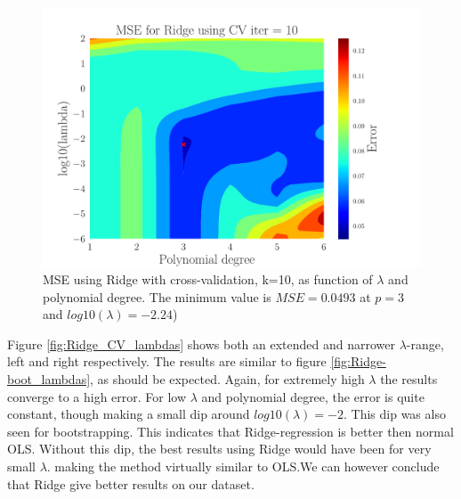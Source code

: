 \documentclass[reprint,english,notitlepage,aps,nobalancelastpage,nofootinbib]{revtex4-1}  %
\begin{document}
\begin{figure}[h]
	\begin{center}
		\includegraphics[width=0.8\linewidth]{Contour_PL_Ridge_CV10_n30_eps0.2_p1_6_lmb2_m6.pdf}
	\end{center}
	\caption{MSE using Ridge with cross-validation, k=10, as function of $\lambda$ and polynomial degree. The minimum value is $MSE=0.0493$ at $p=3$ and $log10(\lambda)=-2.24$)}
	\label{fig:Ridge_CV_heatmap}
\end{figure}

Figure \ref{fig:Ridge_CV_lambdas} shows both an extended and narrower $\lambda$-range, left and right respectively. The results are similar to figure \ref{fig:Ridge-boot_lambdas}, as should be expected. Again, for extremely high $\lambda$ the results converge to a high error. For low $\lambda$ and polynomial degree, the error is quite constant, though making a small dip around $log10(\lambda)=-2$. This dip was also seen for bootstrapping. This indicates that Ridge-regression is better then normal OLS. Without this dip, the best results using Ridge would have been for very small $\lambda$. making the method virtually similar to OLS.We can however conclude that Ridge give better results on our dataset.
\end{document}

